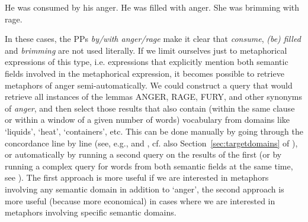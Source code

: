 \begin{exe}
\ex
\begin{xlist}
\label{ex:angerheatpattern}
\ex He was consumed by his anger.
\ex He was filled with anger.
\ex She was brimming with rage.
\end{xlist}
\end{exe}

In these cases, the PPs \textit{by\slash with anger\slash rage}  make it clear that \textit{consume}, \textit{(be) filled} and \textit{brimming} are not used literally.  If we limit ourselves just to metaphorical  expressions of this type, i.e. expressions that explicitly mention both semantic  fields involved in the metaphorical expression, it becomes possible to retrieve  metaphors of anger semi\hyp{}automatically. We could construct a query  that would retrieve all instances of the lemmas  ANGER, RAGE, FURY, and other synonyms  of \textit{anger}, and then select those results that also contain (within the same clause or within a window of a given number of words) vocabulary from domains like `liquids', `heat', `containers', etc. This can be done manually  by going through the concordance  line by line (see, e.g., \citet{tissari_lovescapes:_2003} and \citet{stefanowitsch_happiness_2004, stefanowitsch_words_2006}, cf. also Section~\ref{sec:targetdomains} of ), or automatically by running a second query  on the results of the first (or by running a complex query for words from both semantic  fields at the same time, see \citealt{martin_corpus-based_2006}). The first approach is more useful if we are interested in metaphors  involving any semantic domain in addition to `anger',  the second approach is more useful (because more economical) in cases where we are interested in metaphors involving specific semantic domains.

